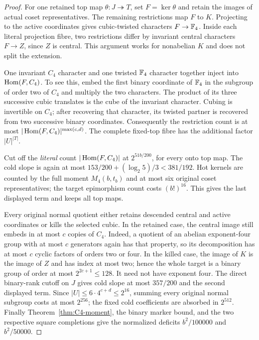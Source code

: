 \begin{proof}
For one retained top map $\theta:J\twoheadrightarrow T$, set
$F=\ker\theta$ and retain the images of actual coset representatives.
The remaining restrictions map $F$ to $K$. Projecting to the active
coordinates gives cubic-twisted characters $F\to\mathbb F_4$. Inside each
literal projection fibre, two restrictions differ by invariant central
characters $F\to Z$, since $Z$ is central. This argument works for
nonabelian $K$ and does not split the extension.

One invariant $C_4$ character and one twisted $\mathbb F_4$ character together
inject into $\operatorname{Hom}(F,C_4)$. To see this, embed the first binary coordinate
of $\mathbb F_4$ in the subgroup of order two of $C_4$ and multiply the two
characters. The product of its three successive cubic translates is
the cube of the invariant character. Cubing is invertible on $C_4$;
after recovering that character, its twisted partner is recovered from
two successive binary coordinates. Consequently the restriction count
is at most $|\operatorname{Hom}(F,C_4)|^{\max(c,d)}$. The complete fixed-top fibre
has the additional factor $|U|^{|T|}$.

Cut off the \emph{literal} count $|\operatorname{Hom}(F,C_4)|$ at $2^{51b/200}$,
for every onto top map. The cold slope is again at most
$153/200+(\log_2 5)/3<381/192$. Hot kernels are counted by the full
moment $M_4(b,t_b)$ and at most six original coset representatives;
the target epimorphism count costs $(b!)^{16}$. This gives the last
displayed term and keeps all top maps.

Every original normal quotient either retains descended central and
active coordinates or kills the selected cubic. In the retained case,
the central image still embeds in at most $c$ copies of $C_4$.
Indeed, a quotient of an abelian exponent-four group with at most $c$
generators again has that property, so its decomposition has at most
$c$ cyclic factors of orders two or four. In the killed case, the
image of $K$ is the image of $Z$ and has index at most two; hence the
whole target is a binary group of order at most $2^{2c+1}\leq128$.
It need not have exponent four. The direct binary-rank cutoff on $J$
gives cold slope at most $357/200$ and the second displayed term.
Since $|U|\leq6\cdot4^{c+d}\leq2^{16}$, summing every original normal
subgroup costs at most $2^{256}$; the fixed cold coefficients are
absorbed in $2^{512}$. Finally Theorem~\ref{thm:C4-moment}, the binary
marker bound, and the two respective square completions give the
normalized deficits $b^2/100000$ and $b^2/50000$.
\end{proof}

